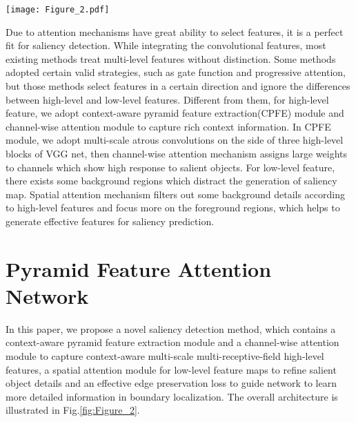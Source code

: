 \documentclass[10pt,twocolumn,letterpaper]{article}
\begin{document}
\begin{figure*}[t]
\centering
\texttt{[image: Figure\_2.pdf]}
\caption{The overall architecture of our method. CPFE means context-aware pyramid feature extraction. The high-level features are from vgg3-3, vgg4-3 and vgg5-3. The low-level features are from vgg1-2 and 2-2, which upsample to the size of vgg1-2.}
\label{fig:Figure_2}
\end{figure*}

Due to attention mechanisms have great ability to select features, it is a perfect fit for saliency detection. While integrating the convolutional features, most existing methods treat multi-level features without distinction. Some methods adopted certain valid strategies, such as gate function\cite{bdmpm} and progressive attention\cite{pagrn}, but those methods select features in a certain direction and ignore the differences between high-level and low-level features. Different from them, for high-level feature, we adopt context-aware pyramid feature extraction(CPFE) module and channel-wise attention module  to capture rich context information. In CPFE module, we adopt multi-scale atrous convolutions on the side of three high-level blocks of VGG net, then channel-wise attention mechanism assigns large weights to channels which show high response to salient objects. For low-level feature, there exists some background regions which distract the generation of saliency map. Spatial attention mechanism filters out some background details according to high-level features and focus more on the foreground regions, which helps to generate effective features for saliency prediction. 

\section{Pyramid Feature Attention Network}
In this paper, we propose a novel saliency detection method, which contains a context-aware pyramid feature extraction module and a channel-wise attention module to capture context-aware multi-scale multi-receptive-field high-level features, a spatial attention module for low-level feature maps to refine salient object details and an effective edge preservation loss to guide network to learn more detailed information in boundary localization. The overall architecture is illustrated in Fig.\ref{fig:Figure_2}.
\end{document}
